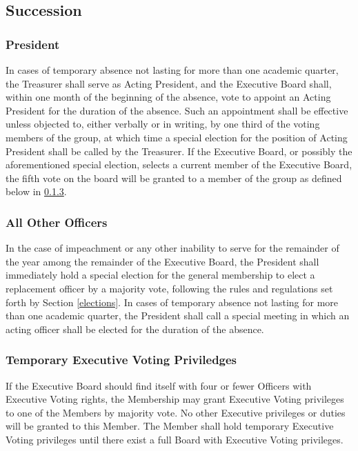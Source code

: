 \documentclass{article}
\begin{document}
\subsection{Succession}

\subsubsection{President}

In cases of temporary absence not lasting for more than one academic
quarter, the Treasurer shall serve as Acting President, and the Executive
Board shall, within one month of the beginning of the absence, vote
to appoint an Acting President for the duration of the absence. Such
an appointment shall be effective unless objected to, either verbally
or in writing, by one third of the voting members of the group, at
which time a special election for the position of Acting President
shall be called by the Treasurer. If the Executive Board, or possibly
the aforementioned special election, selects a current member of the
Executive Board, the fifth vote on the board will be granted to a
member of the group as defined below in \ref{temporary_voting}.

\subsubsection{All Other Officers}

In the case of impeachment or any other inability to serve for the remainder of
the year among the remainder of the Executive Board, the President shall
immediately hold a special election for the general membership to elect a
replacement officer by a majority vote, following the rules and regulations set
forth by Section \ref{elections}. In cases of temporary absence not lasting for more than
one academic quarter, the President shall call a special meeting in which an
acting officer shall be elected for the duration of the absence.

\subsubsection{Temporary Executive Voting Priviledges} \label{temporary_voting}

If the Executive Board should find itself with four or fewer Officers
with Executive Voting rights, the Membership may grant Executive Voting
privileges to one of the Members by majority vote. No other Executive
privileges or duties will be granted to this Member. The Member shall
hold temporary Executive Voting privileges until there exist a full
Board with Executive Voting privileges.
\end{document}
